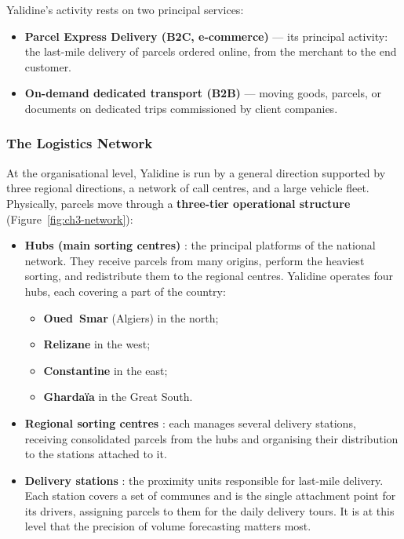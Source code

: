 Yalidine's activity rests on two principal services:

\begin{itemize}[noitemsep]
    \item \textbf{Parcel Express Delivery (B2C, e-commerce)} --- its principal activity: the last-mile
          delivery of parcels ordered online, from the merchant to the end customer.
    \item \textbf{On-demand dedicated transport (B2B)} --- moving goods, parcels, or documents on
          dedicated trips commissioned by client companies.
\end{itemize}

\subsubsection{The Logistics Network}

At the organisational level, Yalidine is run by a general direction supported by three regional
directions, a network of call centres, and a large vehicle fleet. Physically, parcels move through a
\textbf{three-tier operational structure} (Figure~\ref{fig:ch3-network}):

\begin{itemize}[noitemsep]
    \item \textbf{Hubs (main sorting centres)} : the principal platforms of the national network.
          They receive parcels from many origins, perform the heaviest sorting, and redistribute them
          to the regional centres. Yalidine operates four hubs, each covering a part of the country:
          \begin{itemize}[noitemsep, topsep=2pt]
              \item \textbf{Oued~Smar} (Algiers) in the north;
              \item \textbf{Relizane} in the west;
              \item \textbf{Constantine} in the east;
              \item \textbf{Ghardaïa} in the Great South.
          \end{itemize}
    \item \textbf{Regional sorting centres} : each manages several delivery stations, receiving
          consolidated parcels from the hubs and organising their distribution to the stations attached
          to it.
    \item \textbf{Delivery stations} : the proximity units responsible for last-mile delivery. Each
          station covers a set of communes and is the single attachment point for its drivers,
          assigning parcels to them for the daily delivery tours. It is at this level that the
          precision of volume forecasting matters most.
\end{itemize}

